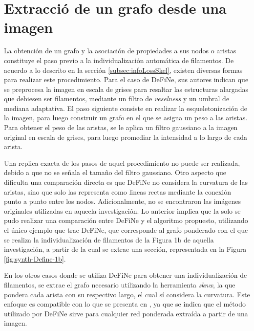 \section{Extracci\'o de un grafo desde una imagen}
\label{sec:graphImageExtraction}
La obtenci\'on de un grafo y la asociaci\'on de propiedades a sus nodos o aristas constituye el paso previo a la individualizaci\'on autom\'atica de filamentos. De acuerdo a lo descrito en la secci\'on \ref{subsec:infoLossSkel}, existen diversas formas para realizar este procedimiento. Para el caso de DeFiNe, sus autores indican que se preprocesa la imagen en escala de grises para resaltar las estructuras alargadas que debiesen ser filamentos, mediante un filtro de {\it veselness} y un umbral de mediana adaptativa. El paso siguiente consiste en realizar la esqueletonizaci\'on de la imagen, para luego construir un grafo en el que se asigna un peso a las aristas. 
Para obtener el peso de las aristas, se le aplica un filtro gaussiano a la imagen original en escala de grises, para luego promediar la intensidad a lo largo de cada arista.


Una replica exacta de los pasos de aquel procedimiento no puede ser realizada, debido a que no se se\~nala el tama\~no del filtro gaussiano. Otro aspecto que dificulta una comparaci\'on directa es que DeFiNe no considera la curvatura de las aristas, sino que solo las representa como lineas rectas mediante la conexión punto a punto entre los nodos. Adicionalmente, no se encontraron las im\'agenes originales utilizadas en aqueela investigaci\'on. Lo anterior implica que la solo se pudo realizar una comparaci\'on entre DeFiNe y el algoritmo propuesto, utilizando el \'unico ejemplo que trae DeFiNe, que corresponde al grafo ponderado con el que se realiza la individualizaci\'on de filamentos de la Figura 1b de aquella investigaci\'on, a partir de la cual se extrae una secci\'on, representada en la Figura \ref{fig:synth-Define-1b}.


En los otros casos donde se utiliza DeFiNe para obtener una individualizaci\'on de filamentos, se extrae el grafo necesario utilizando la herramienta {\it sknw}, la que pondera cada arista con su respectivo largo, el cual s\'i considera la curvatura. Este enfoque es compatible con lo que se presenta en \cite{breuer2015define}, ya que se indica que el m\'etodo utilizado por DeFiNe sirve para cualquier red ponderada extra\'ida a partir de una imagen.


